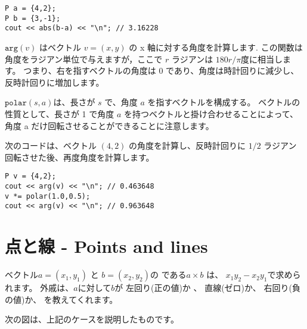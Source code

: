 \begin{lstlisting}
P a = {4,2};
P b = {3,-1};
cout << abs(b-a) << "\n"; // 3.16228
\end{lstlisting}

$\texttt{arg}(v)$ はベクトル $v = (x, y)$ の x 軸に対する角度を計算します.
この関数は角度をラジアン単位で与えますが，ここで $r$ ラジアンは $180 r/\pi$度に相当します。
つまり、右を指すベクトルの角度は 0 であり、角度は時計回りに減少し、反時計回りに増加します。

$\texttt{polar}(s,a)$は、長さが $s$ で、角度 $a$ を指すベクトルを構成する。
ベクトルの性質として、長さが 1 で角度 $a$ を持つベクトルと掛け合わせることによって、
角度 a だけ回転させることができることに注意します。

次のコードは、ベクトル $(4, 2)$ の角度を計算し、反時計回りに $1/2$ ラジアン 回転させた後、再度角度を計算します。

\begin{lstlisting}
P v = {4,2};
cout << arg(v) << "\n"; // 0.463648
v *= polar(1.0,0.5);
cout << arg(v) << "\n"; // 0.963648
\end{lstlisting}

\section{点と線 - Points and lines}


ベクトル$a=(x_1,y_1)$ と $b=(x_2,y_2)$の
である$a \times b$ は、
$x_1 y_2 - x_2 y_1$で求められます。
外戚は、$a$に対して$b$が
左回り(正の値)か 、
直線(ゼロ)か、
右回り(負の値)か、
を教えてくれます。

次の図は、上記のケースを説明したものです。

\begin{center}
\end{center}

